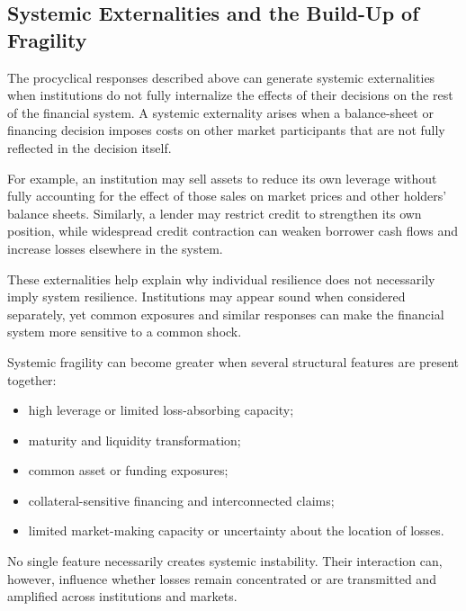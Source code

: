 \subsection{Systemic Externalities and the Build-Up of Fragility}

The procyclical responses described above can generate systemic externalities when institutions do not fully internalize the effects of their decisions on the rest of the financial system. A systemic externality arises when a balance-sheet or financing decision imposes costs on other market participants that are not fully reflected in the decision itself.

For example, an institution may sell assets to reduce its own leverage without fully accounting for the effect of those sales on market prices and other holders' balance sheets. Similarly, a lender may restrict credit to strengthen its own position, while widespread credit contraction can weaken borrower cash flows and increase losses elsewhere in the system.

These externalities help explain why individual resilience does not necessarily imply system resilience. Institutions may appear sound when considered separately, yet common exposures and similar responses can make the financial system more sensitive to a common shock.

Systemic fragility can become greater when several structural features are present together:

\begin{itemize}

\item high leverage or limited loss-absorbing capacity;

\item maturity and liquidity transformation;

\item common asset or funding exposures;

\item collateral-sensitive financing and interconnected claims;

\item limited market-making capacity or uncertainty about the location of losses.

\end{itemize}

No single feature necessarily creates systemic instability. Their interaction can, however, influence whether losses remain concentrated or are transmitted and amplified across institutions and markets.


